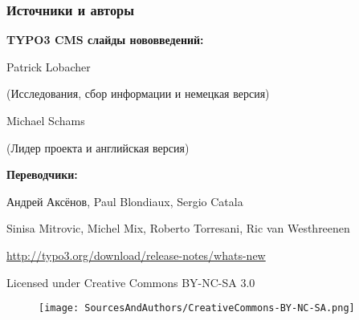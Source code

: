 \begin{frame}[fragile]
	\frametitle{Источники и авторы}

	\vspace{-0.6cm}

	\centerline{\textbf{TYPO3 CMS слайды нововведений:}}

	\begin{center}
		\smaller
			\centerline{Patrick Lobacher}
			\centerline{(Исследования, сбор информации и немецкая версия)}
			\vspace{0.1cm}
			\centerline{Michael Schams}
			\centerline{(Лидер проекта и английская версия)}
		\normalsize
	\end{center}
	\vspace{-0.6cm}
	\begin{center}
		\smaller
			\centerline{\textbf{Переводчики:}}
			\centerline{Андрей Аксёнов, Paul Blondiaux, Sergio Catala}
			\centerline{Sinisa Mitrovic, Michel Mix, Roberto Torresani, Ric van Westhreenen}
		\normalsize
	\end{center}
	\vspace{-0.6cm}
	\smaller\begin{center}\url{http://typo3.org/download/release-notes/whats-new}\end{center}\normalsize

	\smaller\begin{center}Licensed under Creative Commons BY-NC-SA 3.0\end{center}\normalsize
	\begin{figure}\vspace*{-0.3cm}
		\texttt{[image: SourcesAndAuthors/CreativeCommons-BY-NC-SA.png]}
	\end{figure}

\end{frame}

